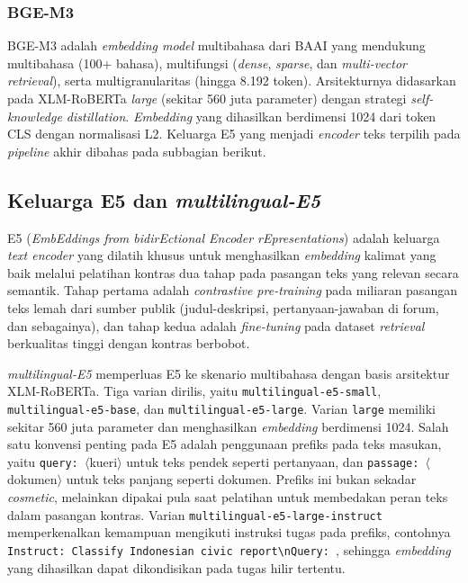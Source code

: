 \subsubsection{BGE-M3}

BGE-M3 \citep{chenBGEM32024} adalah \textit{embedding model} multibahasa dari BAAI yang mendukung multibahasa (100+ bahasa), multifungsi (\textit{dense}, \textit{sparse}, dan \textit{multi-vector retrieval}), serta multigranularitas (hingga 8.192 token). Arsitekturnya didasarkan pada XLM-RoBERTa \textit{large} (sekitar 560 juta parameter) dengan strategi \textit{self-knowledge distillation}. \textit{Embedding} yang dihasilkan berdimensi 1024 dari token CLS dengan normalisasi L2. Keluarga E5 yang menjadi \textit{encoder} teks terpilih pada \textit{pipeline} akhir dibahas pada subbagian berikut.

\subsection{Keluarga E5 dan \textit{multilingual-E5}}

E5 (\textit{EmbEddings from bidirEctional Encoder rEpresentations}) adalah keluarga \textit{text encoder} yang dilatih khusus untuk menghasilkan \textit{embedding} kalimat yang baik melalui pelatihan kontras dua tahap pada pasangan teks yang relevan secara semantik. Tahap pertama adalah \textit{contrastive pre-training} pada miliaran pasangan teks lemah dari sumber publik (judul-deskripsi, pertanyaan-jawaban di forum, dan sebagainya), dan tahap kedua adalah \textit{fine-tuning} pada dataset \textit{retrieval} berkualitas tinggi dengan kontras berbobot.

\textit{multilingual-E5} \citep{wangE5Multilingual2024} memperluas E5 ke skenario multibahasa dengan basis arsitektur XLM-RoBERTa. Tiga varian dirilis, yaitu \texttt{multilingual-\allowbreak{}e5-\allowbreak{}small}, \texttt{multilingual-\allowbreak{}e5-\allowbreak{}base}, dan \texttt{multilingual-\allowbreak{}e5-\allowbreak{}large}. Varian \texttt{large} memiliki sekitar 560 juta parameter dan menghasilkan \textit{embedding} berdimensi 1024. Salah satu konvensi penting pada E5 adalah penggunaan prefiks pada teks masukan, yaitu \texttt{query: }$\langle$kueri$\rangle$ untuk teks pendek seperti pertanyaan, dan \texttt{passage: }$\langle$dokumen$\rangle$ untuk teks panjang seperti dokumen. Prefiks ini bukan sekadar \textit{cosmetic}, melainkan dipakai pula saat pelatihan untuk membedakan peran teks dalam pasangan kontras. Varian \texttt{multilingual-e5-large-instruct} memperkenalkan kemampuan mengikuti instruksi tugas pada prefiks, contohnya \texttt{Instruct: Classify Indonesian civic report\textbackslash nQuery: }, sehingga \textit{embedding} yang dihasilkan dapat dikondisikan pada tugas hilir tertentu.

